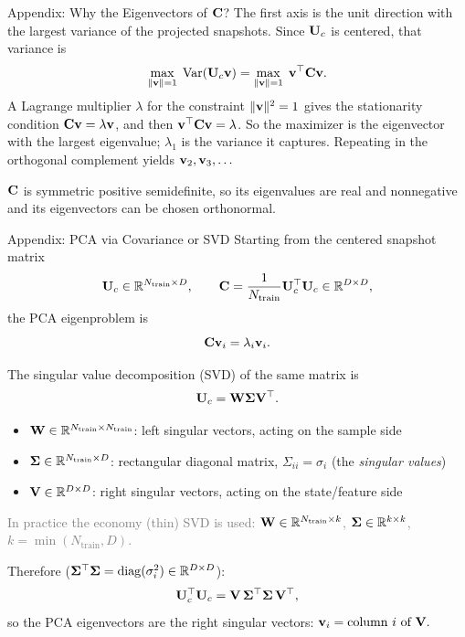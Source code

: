 \documentclass[10pt,aspectratio=169]{ntuabeamer}
\begin{document}
\appendix
{}

\begin{frame}{Appendix: Why the Eigenvectors of \(\mathbf{C}\)?}
  \small
  The first axis is the unit direction with the largest variance of the projected snapshots.
  Since \(\mathbf{U}_c\) is centered, that variance is
  \[
    \max_{\|\mathbf{v}\|=1}\;\mathrm{Var}(\mathbf{U}_c\mathbf{v})
    =
    \max_{\|\mathbf{v}\|=1}\;\mathbf{v}^{\top}\mathbf{C}\mathbf{v}.
  \]
  A Lagrange multiplier \(\lambda\) for the constraint \(\|\mathbf{v}\|^2=1\) gives the stationarity condition
  \(\mathbf{C}\mathbf{v}=\lambda\mathbf{v}\), and then \(\mathbf{v}^{\top}\mathbf{C}\mathbf{v}=\lambda\).
  So the maximizer is the eigenvector with the largest eigenvalue; \(\lambda_1\) is the variance it captures.
  Repeating in the orthogonal complement yields \(\mathbf{v}_2,\mathbf{v}_3,\dots\)

  \vspace{0.4em}
  \(\mathbf{C}\) is symmetric positive semidefinite, so its eigenvalues are real and nonnegative and its eigenvectors can be chosen orthonormal.
\end{frame}

\begin{frame}{Appendix: PCA via Covariance or SVD}
  \small
  Starting from the centered snapshot matrix
  \[
    \mathbf{U}_c \in \mathbb{R}^{N_{\mathrm{train}} \times D},
    \qquad
    \mathbf{C} = \frac{1}{N_{\mathrm{train}}}\mathbf{U}_c^{\top}\mathbf{U}_c \in \mathbb{R}^{D\times D},
  \]
  the PCA eigenproblem is
  \[
    \mathbf{C}\mathbf{v}_i = \lambda_i \mathbf{v}_i.
  \]

  The singular value decomposition (SVD) of the same matrix is
  \[
    \mathbf{U}_c = \mathbf{W}\mathbf{\Sigma}\mathbf{V}^{\top}.
  \]

  \begin{itemize}
    \item \(\mathbf{W} \in \mathbb{R}^{N_{\mathrm{train}} \times N_{\mathrm{train}}}\): left singular vectors, acting on the sample side
    \item \(\mathbf{\Sigma} \in \mathbb{R}^{N_{\mathrm{train}} \times D}\): rectangular diagonal matrix, \(\Sigma_{ii}=\sigma_i\) (the \emph{singular values})
    \item \(\mathbf{V} \in \mathbb{R}^{D \times D}\): right singular vectors, acting on the state/feature side
  \end{itemize}

  \textcolor{gray}{\footnotesize In practice the economy (thin) SVD is used:
    \(\mathbf{W}\in\mathbb{R}^{N_{\mathrm{train}}\times k}\),
    \(\mathbf{\Sigma}\in\mathbb{R}^{k\times k}\),
    \(k=\min(N_{\mathrm{train}},D)\).}

  Therefore (\(\mathbf{\Sigma}^{\top}\mathbf{\Sigma}=\mathrm{diag}(\sigma_i^2)\in\mathbb{R}^{D\times D}\)):
  \[
    \mathbf{U}_c^{\top}\mathbf{U}_c = \mathbf{V}\,\mathbf{\Sigma}^{\top}\mathbf{\Sigma}\,\mathbf{V}^{\top},
  \]
  so the PCA eigenvectors are the right singular vectors:
  \(\mathbf{v}_i = \text{column } i \text{ of } \mathbf{V}.\)
\end{frame}
\end{document}
